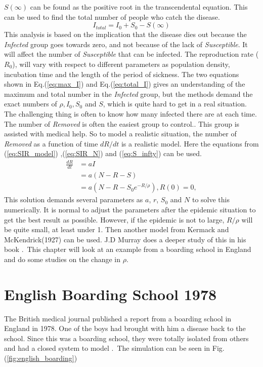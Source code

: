 \documentclass[%
twoside,                 %
final,                   %
chapterprefix=true,      %
open=right               %
10pt]{book}
\begin{document}
$S(\infty)$ can be found as the positive root in the transcendental equation. This can be used to find the total number of people who catch the disease.
\begin{equation} \label{eq:total_I}
I_{total} = I_0 + S_0 -S(\infty)
\end{equation}
This analysis is based on the implication that the disease dies out because the \emph{Infected} group goes towards zero, and not because of the lack of \emph{Susceptible}. It will affect the number of \emph{Susceptible} that can be infected. The reproduction rate ($R_0$), will vary with respect to different parameters as population density, incubation time and the length of the period of sickness. The two equations shown in Eq.(\ref{eq:max_I}) and Eq.(\ref{eq:total_I}) gives an understanding of the maximum and total number in the \emph{Infected} group, but the methods demand the exact numbers of $\rho,I_0,S_0$ and $S$, which is quite hard to get in a real situation. The challenging thing is often to know how many infected there are at each time. The number of \emph{Removed} is often the easiest group to control.. This group is assisted with medical help. So to model a realistic situation, the number of \emph{Removed} as a function of time $dR/dt$ is a realistic model. Here the equations from (\ref{eq:SIR_model}) ,(\ref{eq:SIR_N}) and (\ref{eq:S_infty}) can be used.
\begin{equation} \label{eq:dR_normal}
	\begin{aligned} 
	\frac{dR}{dt} &= aI\\
	&= a(N-R-S)\\
	&= a(N-R-S_0e^{-R/\rho}), R(0)=0,
	\end{aligned}
\end{equation}
This solution demands several parameters as $a$, $r$, $S_0$ and $N$ to solve this numerically. It is normal to adjust the parameters after the epidemic situation to get the best result as possible. However, if the epidemic is not to large, $R/\rho$ will be quite small, at least under 1. Then another model from Kermack and McKendrick(1927) can be used. J.D Murray does a deeper study of this in his book \cite[p.~324]{murray2002mathematical}.~This chapter will look at an example from a boarding school in England and do some studies on the change in $\rho$.  

\section{English Boarding School 1978}
The British medical journal published a report from a boarding school in England in 1978. One of the boys had brought with him a disease back to the school. Since this was a boarding school, they were totally isolated from others and had a closed system to model \cite[p.~325]{murray2002mathematical}.~The simulation can be seen in Fig.(\ref{fig:english_boarding})  
\end{document}
